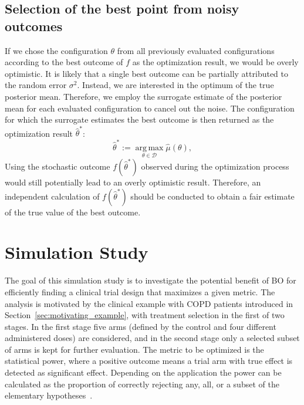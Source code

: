 \documentclass[bimj,fleqn]{w-art}
\theoremstyle{plain}
\theoremstyle{definition}
\begin{document}
\subsection{Selection of the best point from noisy outcomes}
\label{ssec:best_point}
If we chose the configuration $\theta$ from all previously evaluated configurations according to the best outcome of $f$ as the optimization result, we would be overly optimistic.
It is likely that a single best outcome can be partially attributed to the random error $\sigma^2$.
Instead, we are interested in the optimum of the true posterior mean.
Therefore, we employ the surrogate estimate of the posterior mean for each evaluated configuration to cancel out the noise.
The configuration for which the surrogate estimates the best outcome is then returned as the optimization result $\hat{\theta}^\ast$:
\begin{equation}
  \hat{\theta}^{\ast} := \operatorname{arg\,max}\limits_{\theta \in \mathcal{D}} \hat{\mu}(\theta),
\end{equation}
Using the stochastic outcome $f(\hat{\theta}^\ast) $ observed during the optimization process would still potentially lead to an overly optimistic result.
Therefore, an independent calculation of $f(\hat{\theta}^\ast)$ should be conducted to obtain a fair estimate of the true value of the best outcome.

\section{Simulation Study}
\label{sec:simulation_study}

The goal of this simulation study is to investigate the potential benefit of BO for efficiently finding a clinical trial design that maximizes a given metric.
The analysis is motivated by the clinical example with COPD patients introduced in Section~\ref{sec:motivating_example}, with treatment selection in the first of two stages.
In the first stage five arms (defined by the control and four different administered doses) are considered, and in the second stage only a selected subset of arms is kept for further evaluation. 
The metric to be optimized is the statistical power, where a positive outcome means a trial arm with true effect is detected as significant effect.
Depending on the application the power can be calculated as the proportion of correctly rejecting any, all, or a subset of the elementary hypotheses~\citep{senn_power_2007}.
\end{document}
